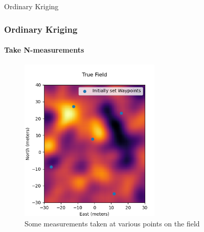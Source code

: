 \documentclass[professionalfont,10pt]{beamer}
\begin{document}
	\begin{frame}[t]{Ordinary Kriging}
		\frametitle{Ordinary Kriging}
		\framesubtitle{Take N-measurements}
		\hskip-0.75cm
		\begin{minipage}[t]{0.2\linewidth}\vspace{-0.5cm}
			\tiny\tableofcontents[currentsection,currentsubsection,hideothersubsections,subsectionstyle=show/shaded]
		\end{minipage}
		\hfill%
		\begin{minipage}[t]{0.86\linewidth}\vspace{-0.5cm}
			\begin{figure}[t]
				\centering
				\captionsetup{width=0.9\textwidth}
				\includegraphics[width=0.6\textwidth]{../images/MeasurementsOnField.png}
				\caption{Some measurements taken at various points on the field}
				\label{CFandEncoder}
			\end{figure}
		\end{minipage}
		\vfill%
	\end{frame}
\end{document}
